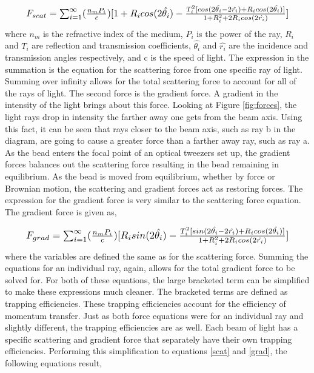 \documentclass[%
 aip,
 amsmath,amssymb,
 reprint,%
]{revtex4-1}
\begin{document}
\begin{equation}
\resizebox{.9\hsize}{!}{$ F_{scat} = \sum_{i=1}^{\infty} (\frac{n_m P_i}{c})[1+R_i cos(2\hat{\theta_i}) \\ -\frac{T_i^2 [cos(2\hat{\theta_i}-2\hat{r_i})+R_i cos(2\hat{\theta_i})]}{1+R_i^2 +2R_i cos(2\hat{r_i})}]$}
\label{scat}
\end{equation}    
    where $n_m$ is the refractive index of the medium, $P_i$ is the power of the ray, $R_i$ and $T_i$ are reflection and transmission coefficients, $\hat{\theta_i}$ and $\hat{r_i}$ are the incidence and transmission angles respectively, and c is the speed of light\cite{brownian}. The expression in the summation is the equation for the scattering force from one specific ray of light. Summing over infinity allows for the total scattering force to account for all of the rays of light. The second force is the gradient force. A gradient in the intensity of the light brings about this force. Looking at Figure \ref{fig:forces}, the light rays drop in intensity the farther away one gets from the beam axis. Using this fact, it can be seen that rays closer to the beam axis, such as ray b in the diagram, are going to cause a greater force than a farther away ray, such as ray a. As the bead enters the focal point of an optical tweezers set up, the gradient forces balances out the scattering force resulting in the bead remaining in equilibrium. As the bead is moved from equilibrium, whether by force or Brownian motion, the scattering and gradient forces act as restoring forces. The expression for the gradient force is very similar to the scattering force equation. The gradient force\cite{brownian} is given as,
    
\begin{equation}
\resizebox{.9\hsize}{!}{$F_{grad} = \sum_{i=1}^{\infty} (\frac{n_m P_i}{c})[R_i sin(2\hat{\theta_i})-\frac{T_i^2 [sin(2\hat{\theta_i}-2\hat{r_i})+R_i cos(2\hat{\theta_i})]}{1+R_i^2 +2R_i cos(2\hat{r_i})}]$}
\label{grad}
\end{equation}
    where the variables are defined the same as for the scattering force. Summing the equations for an individual ray, again, allows for the total gradient force to be solved for. For both of these equations, the large bracketed term can be simplified to make these expressions much cleaner. The bracketed terms are defined as trapping efficiencies. These trapping efficiencies account for the efficiency of momentum transfer\cite{brownian}. Just as both force equations were for an individual ray and slightly different, the trapping efficiencies are as well. Each beam of light has a specific scattering and gradient force that separately have their own trapping efficiencies. Performing this simplification to equations \ref{scat} and \ref{grad}, the following equations result,
    
\end{document}
